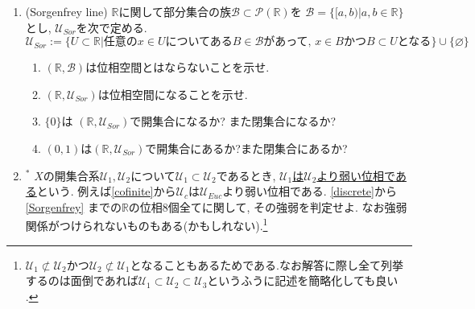 \documentclass[dvipdfmx,a4paper,11pt]{article}
\newcommand{\R}{\mathbb{R}}
\newcommand{\N}{\mathbb{N}}
\theoremstyle{definition}
\begin{document}
\begin{enumerate}[label=\textbf{問}\ref*{sec-open}.\arabic*]
\item(Sorgenfrey line) \label{Sorgenfrey} $\R$に関して部分集合の族$\mathscr{B}\subset \mathcal{P}(\R)$を
$
\mathscr{B} = \{ [a, b) | a,b \in \R\}
$
とし, $\mathscr{U}_{Sor}$を次で定める. 
$$
\mathscr{U}_{Sor} := \{ U \subset \R | \text{任意の$x \in U$についてある$B \in \mathscr{B}$があって, $x \in B$かつ$B \subset U$となる}\} \cup \{  \varnothing \}
$$
	\begin{enumerate}	
	\setlength{\parskip}{0cm}
	\setlength{\itemsep}{0pt} 
	\item $(\R,\mathscr{B}  )$は位相空間とはならないことを示せ. 
	\item $(\R,\mathscr{U}_{Sor})$は位相空間になることを示せ.
	\item $\{ 0\}$は $(\R,\mathscr{U}_{Sor} )$で開集合になるか? また閉集合になるか?
	\item $(0,1)$は$(\R,\mathscr{U}_{Sor})$で開集合にあるか?また閉集合にあるか?
	\end{enumerate}

\item $^{*}$ $X$の開集合系$\mathscr{U}_1, \mathscr{U}_2$について$\mathscr{U}_1 \subset \mathscr{U}_2$であるとき, \underline{$\mathscr{U}_1$は$\mathscr{U}_2$より弱い位相である}という. 例えば\ref{cofinite}から$\mathscr{U}_c $は$\mathscr{U}_{Euc}$より弱い位相である.  
\ref{discrete}から\ref{Sorgenfrey} までの$\R$の位相8個全てに関して, その強弱を判定せよ. なお強弱関係がつけられないものもある(かもしれない).\footnote{$\mathscr{U}_1 \not \subset \mathscr{U}_2$かつ$\mathscr{U}_2 \not \subset\mathscr{U}_1$となることもあるためである.なお解答に際し全て列挙するのは面倒であれば$\mathscr{U}_1 \subset \mathscr{U}_2 \subset \mathscr{U}_3$というふうに記述を簡略化しても良い .} 





\end{enumerate}
\end{document}
